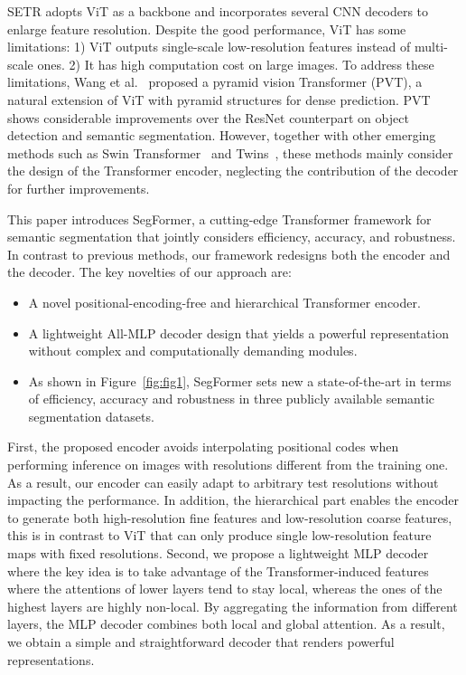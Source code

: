 SETR adopts ViT as a backbone and incorporates several CNN decoders to enlarge feature resolution. Despite the good performance, ViT has some limitations: 1) ViT outputs single-scale low-resolution features instead of multi-scale ones. 2) It has high computation cost on large images. To address these limitations, Wang et al.~\cite{pvt} proposed a pyramid vision Transformer (PVT), a natural extension of ViT with pyramid structures for dense prediction. PVT shows considerable improvements over the ResNet counterpart on object detection and semantic segmentation. However, together with other emerging methods such as Swin Transformer~\cite{liu2021swin} and Twins~\cite{chu2021twins}, these methods mainly consider the design of the Transformer encoder, neglecting the contribution of the decoder for further improvements.



This paper introduces SegFormer, a cutting-edge Transformer framework for semantic segmentation that jointly considers efficiency, accuracy, and robustness. In contrast to previous methods, our framework redesigns both the encoder and the decoder. The key novelties of our approach are:
\begin{itemize}[leftmargin=*]
\item A novel positional-encoding-free and hierarchical Transformer encoder.
\item A lightweight All-MLP decoder design that yields a powerful representation without complex and computationally demanding modules.
\item As shown in Figure~\ref{fig:fig1}, SegFormer sets new a state-of-the-art in terms of efficiency, accuracy and robustness in three publicly available semantic segmentation datasets.
\end{itemize}

First, the proposed encoder avoids interpolating positional codes when performing inference on images with resolutions different from the training one. As a result, our encoder can easily adapt to arbitrary test resolutions without impacting the performance. In addition, the hierarchical part enables the encoder to generate both high-resolution fine features and low-resolution coarse features, this is in contrast to ViT that can only produce single low-resolution feature maps with fixed resolutions.
Second, we propose a lightweight MLP decoder where the key idea is to take advantage of the Transformer-induced features where the attentions of lower layers tend to stay local, whereas the ones of the highest layers are highly non-local. By aggregating the information from different layers, the MLP decoder combines both local and global attention. As a result, we obtain a simple and straightforward decoder that renders powerful representations.  



